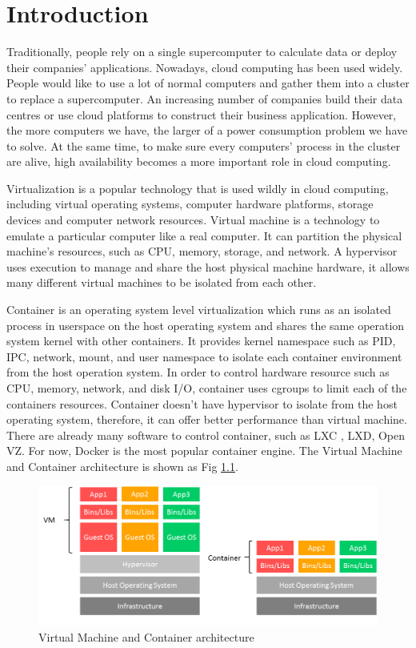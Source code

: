 \chapter{Introduction}
\label{chap:intro}
Traditionally, people rely on a single supercomputer to calculate data or deploy their companies' applications. Nowadays, cloud computing has been used widely. People would like to use a lot of normal computers and gather them into a cluster to replace a supercomputer. An increasing number of companies build their data centres or use cloud platforms to construct their business application.
However, the more computers we have, the larger of a power consumption problem we have to solve. At the same time, to make sure every computers' process in the cluster are alive, high availability becomes a more important role in cloud computing.

Virtualization is a popular technology that is used wildly in cloud computing, including virtual operating systems, computer hardware platforms, storage devices and computer network resources.
Virtual machine is a technology to emulate a particular computer like a real computer. It can partition the physical machine's resources, such as CPU, memory, storage, and network.
A hypervisor uses execution to manage and share the host physical machine hardware, it allows many different virtual machines to be isolated from each other.

Container is an operating system level virtualization which runs as an isolated process in userspace on the host operating system and shares the same operation system kernel with other containers.
It provides kernel namespace such as PID, IPC, network, mount, and user namespace to isolate each container environment from the host operation system.
In order to control hardware resource such as CPU, memory, network, and disk I/O, container uses cgroups to limit each of the containers resources.
Container doesn't have hypervisor to isolate from the host operating system, therefore, it can offer better performance than virtual machine. There are already many software to control container, such as LXC \cite{helsley2009lxc}, LXD, Open VZ. For now, Docker \cite{Docker} is the most popular container engine. The Virtual Machine and Container architecture is shown as Fig \ref{fig:VM_vs_container}.

\begin{figure}[h]
\begin{center}
\includegraphics[width=15cm]{figure/VM_vs_container.png}
\end{center}
\caption{Virtual Machine and Container architecture}
\label{fig:VM_vs_container}
\end{figure}

